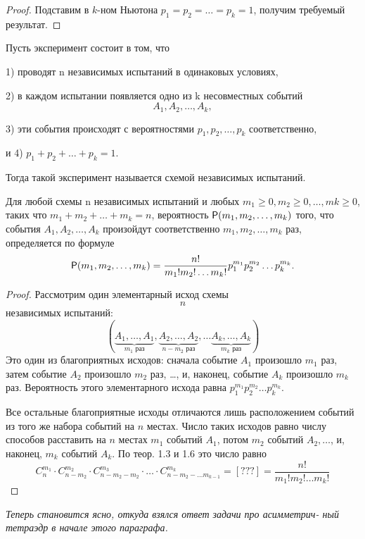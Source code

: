 \begin{proof}
	Подставим в $k$-ном Ньютона $p_1 = p_2 = \dots = p_k = 1$,
получим требуемый результат.
\end{proof}

\begin{definition}
\label{def:9.4}

	Пусть эксперимент состоит в том, что

1) проводят n независимых испытаний в одинаковых условиях,

2) в каждом испытании появляется одно из k несовместных событий
{$$A_1, A_2,\dots, A_k,$$}

3) эти события происходят с вероятностями $p_1, p_2,\dots, p_k$ соответственно,

и 4) $p_1 + p_2 + \dots+ p_k = 1$.

Тогда такой эксперимент называется схемой независимых испытаний.
\end{definition}

\begin{theorem}
\label{th:9.5}

	Для любой схемы n независимых испытаний и любых \newline
$m_1 \geqslant 0, m_2 \geqslant 0,\dots  , mk \geqslant 0$, таких что $m_1 + m_2 +\dots  + m_k = n$, вероятность $\P(m_1,m_2,\dots  ,m_k)$ того, что события $A_1, A_2,\dots  , A_k$ произойдут
соответственно $m_1,m_2,\dots  ,m_k$ раз, определяется по формуле
	\begin{equation*}
		\P(m_1,m_2,\dots,m_k)=\frac{n!}{m_1!m_2!\dots m_k!}p_1^{m_1}p_2^{m_2}\dots p_k^{m_k}.
	\end{equation*}
\end{theorem}

\begin{proof}
Рассмотрим один элементарный исход схемы $$n$$ независимых испытаний:
\begin{equation*}
	(\underbrace{A_1,\ldots , A_1}_{m_1 \text{ раз}}, 
	\underbrace{A_2, \ldots,A_2}_{n-m_2 \text{ раз}},
	\ldots
	\underbrace{A_k,\ldots , A_k}_{m_k \text{ раз}})
\end{equation*}
Это один из благоприятных исходов: сначала событие $A_1$ произошло $m_1$ раз,
затем событие $A_2$ произошло $m_2$ раз, \dots, и, наконец, событие $A_k$ произошло
$m_k$ раз. Вероятность этого элементарного исхода равна 
$p^{m_1}_1p^{m_2}_2\ldots p^{m_k}_k$.

Все остальные благоприятные исходы отличаются лишь расположением
событий из того же набора событий на $n$ местах. Число таких исходов равно
числу способов расставить на $n$ местах $m_1$ событий $A_1$, потом $m_2$ событий
$A_2, \dots$, и, наконец, $m_k$ событий $A_k$. По теор. 1.3 и 1.6 это число равно
\begin{equation*}
	C_n^{m_1}\cdot C_{n-m_2}^{m_2}\cdot C_{n-m_2-m_2}^{m_3}\cdot\dots\cdot
	C_{n-m_2-\dots m_{k-1}}^{m_k}=
	\left[??? \right]=\frac{n!}{m_1!m_2!\ldots m_k!}
\end{equation*}
\end{proof}
\textit{Теперь становится ясно, откуда взялся ответ задачи про асимметрич-
ный тетраэдр в начале этого параграфа.}